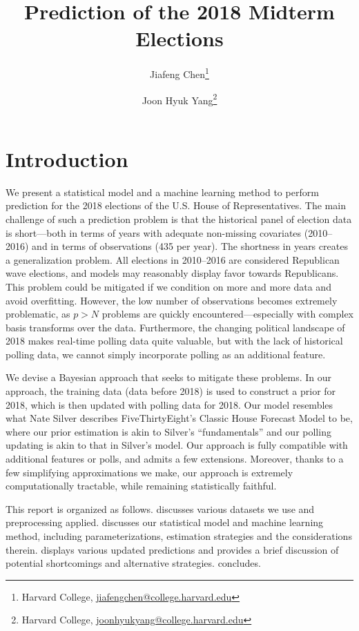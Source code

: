 \documentclass[11pt]{article}
\title{\sffamily\bfseries{Prediction of the 2018 Midterm Elections}}
\author{Jiafeng Chen\thanks{Harvard College, \url{jiafengchen@college.harvard.edu}} \and Joon Hyuk Yang\thanks{Harvard College, \url{joonhyukyang@college.harvard.edu}}}
\begin{document}
\maketitle
\section{Introduction}

We present a statistical model and a machine learning method to perform
prediction for the 2018 elections of the U.S. House of Representatives. The main
challenge of such a prediction problem is that the historical panel of election
data is short---both in terms of years with adequate non-missing covariates 
(2010--2016) and in terms of observations (435 per year). The shortness in years
creates a generalization problem. All elections in 2010--2016 are considered
Republican wave elections, and models may reasonably display favor towards
Republicans. This problem could be mitigated if we condition on more and more
data and avoid overfitting. However, the low number of observations becomes
extremely problematic, as $p > N$ problems are quickly encountered---especially
with complex basis transforms over the data. Furthermore, the changing political
landscape of 2018 makes real-time polling data quite valuable, but with the lack
of historical polling data, we cannot simply incorporate polling as an
additional feature.

We devise a Bayesian approach that seeks to mitigate these problems. In our
approach, the training data (data before 2018) is used to construct a prior for
2018, which is then updated with polling data for 2018. Our model resembles
what Nate Silver describes FiveThirtyEight's Classic House Forecast Model to
be, where our prior estimation is akin to Silver's ``fundamentals'' and our
polling updating is akin to that in Silver's model. Our approach is fully
compatible with additional features or polls, and admits a few extensions.
Moreover, thanks to a few simplifying approximations we make, our approach is
extremely computationally tractable, while remaining statistically faithful. 

This report is organized as follows.  discusses various datasets
we use and preprocessing applied.  discusses our statistical
model and machine learning method, including parameterizations, estimation
strategies and the considerations therein.  displays various
updated predictions and provides a brief discussion of potential shortcomings
and alternative strategies.  concludes.
\end{document}
